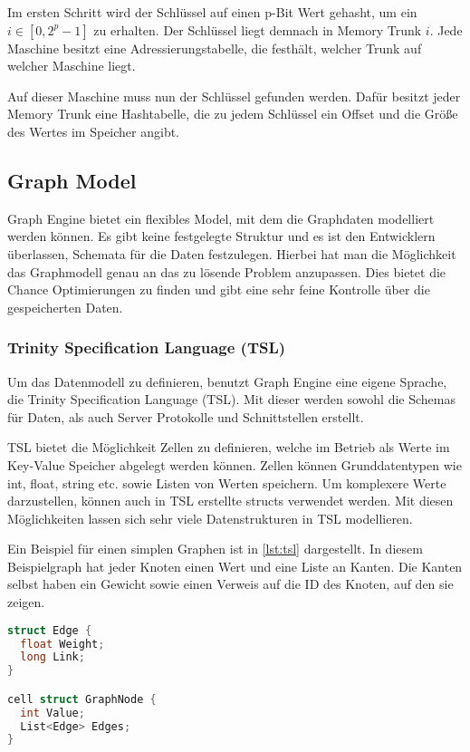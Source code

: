 Im ersten Schritt wird der Schlüssel auf einen p-Bit Wert gehasht, um ein  $ i \in [0, 2^{p} - 1] $ zu erhalten. Der Schlüssel liegt demnach in
Memory Trunk $ i $. Jede Maschine besitzt eine Adressierungstabelle, die festhält, welcher Trunk auf welcher Maschine liegt.

Auf dieser Maschine muss nun der Schlüssel gefunden werden. Dafür besitzt jeder Memory Trunk eine Hashtabelle, die zu jedem Schlüssel
ein Offset und die Größe des Wertes im Speicher angibt.

\subsection{Graph Model}

Graph Engine bietet ein flexibles Model, mit dem die Graphdaten modelliert werden können. Es gibt keine festgelegte Struktur und es ist den Entwicklern
überlassen, Schemata für die Daten festzulegen. Hierbei hat man die Möglichkeit das Graphmodell genau an das zu lösende Problem anzupassen.
Dies bietet die Chance Optimierungen zu finden und gibt eine sehr feine Kontrolle über die gespeicherten Daten.

\subsubsection{Trinity Specification Language (TSL)}

Um das Datenmodell zu definieren, benutzt Graph Engine eine eigene Sprache, die Trinity Specification Language (TSL). Mit dieser werden sowohl die Schemas
für Daten, als auch Server Protokolle und Schnittstellen erstellt. 

TSL bietet die Möglichkeit Zellen zu definieren, welche im Betrieb als Werte im Key-Value Speicher abgelegt werden können.
Zellen können Grunddatentypen wie int, float, string etc. sowie Listen von Werten speichern. Um komplexere Werte darzustellen, können auch in TSL erstellte structs verwendet werden.
Mit diesen Möglichkeiten lassen sich sehr viele Datenstrukturen in TSL modellieren. 

Ein Beispiel für einen simplen Graphen ist in  \ref{lst:tsl} dargestellt. In diesem Beispielgraph hat jeder Knoten 
einen Wert und eine Liste an Kanten. Die Kanten selbst haben ein Gewicht sowie einen Verweis auf die ID des Knoten, auf den sie zeigen.

\begin{lstlisting}[language=c,label={lst:tsl}, caption={Beispiel für eine in TSL definierte Graphenstruktur}]
struct Edge {
  float Weight;
  long Link;
}

cell struct GraphNode {
  int Value;
  List<Edge> Edges;
}
\end{lstlisting}



